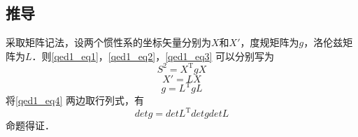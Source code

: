 \subsection{推导}
采取矩阵记法，设两个惯性系的坐标矢量分别为$X$和$X'$，度规矩阵为$g$，洛伦兹矩阵为$L$．则\autoref{qed1_eq1}，\autoref{qed1_eq2}，\autoref{qed1_eq3} 可以分别写为
\begin{equation}
S^{2}=X^{\mathrm{T}} g X
\end{equation}
\begin{equation}
X'=LX
\end{equation}
\begin{equation}\label{qed1_eq4}
g=L^{\mathrm{T}} g L
\end{equation}
将\autoref{qed1_eq4} 两边取行列式，有
\begin{equation}
detg=detL^{\mathrm{T}} detg detL
\end{equation}
命题得证．

